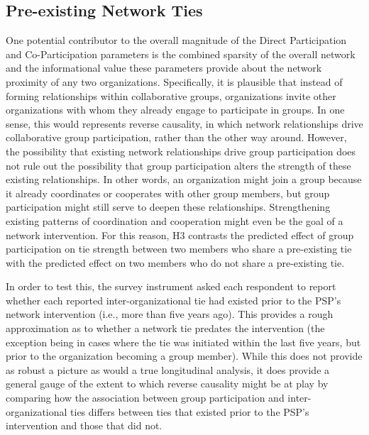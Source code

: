 \documentclass[12pt,a4paper,titlepage]{article}
\begin{document}
\subsection{Pre-existing Network Ties}

One potential contributor to the overall magnitude of the Direct Participation and Co-Participation parameters is the combined sparsity of the overall network and the informational value these parameters provide about the network proximity of any two organizations. Specifically, it is plausible that instead of forming relationships within collaborative groups, organizations invite other organizations with whom they already engage to participate in groups. In one sense, this would represents reverse causality, in which network relationships drive collaborative group participation, rather than the other way around. However, the possibility that existing network relationships drive group participation does not rule out the possibility that group participation alters the strength of these existing relationships. In other words, an organization might join a group because it already coordinates or cooperates with other group members, but group participation might still serve to deepen these relationships. Strengthening existing patterns of coordination and cooperation might even be the goal of a network intervention. For this reason, H3 contrasts the predicted effect of group participation on tie strength between two members who share a pre-existing tie with the predicted effect on two members who do not share a pre-existing tie. 



In order to test this, the survey instrument asked each respondent to report whether each reported inter-organizational tie had existed prior to the PSP’s network intervention (i.e., more than five years ago). This provides a rough approximation as to whether a network tie predates the intervention (the exception being in cases where the tie was initiated within the last five years, but prior to the organization becoming a group member). While this does not provide as robust a picture as would a true longitudinal analysis, it does provide a general gauge of the extent to which reverse causality might be at play by comparing how the association between group participation and inter-organizational ties differs between ties that existed prior to the PSP’s intervention and those that did not.
\end{document}
